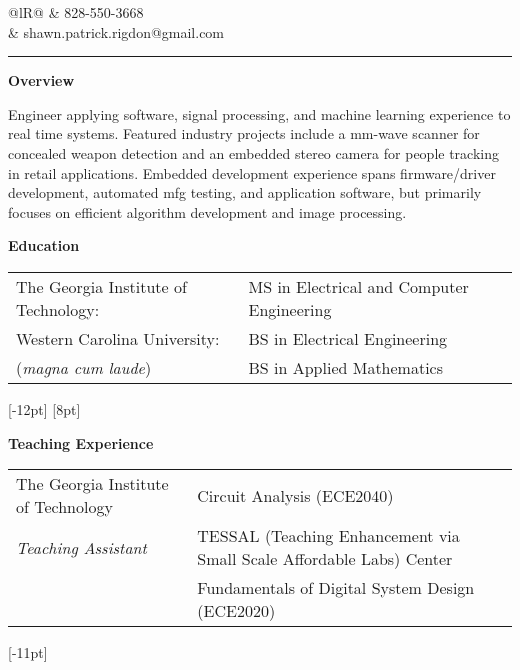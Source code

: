 \documentclass[10pt,letterpaper]{article}
\begin{document}
\pagestyle{empty}


\noindent
\begin{tabularx}{\linewidth}{@{}lR@{}}
 & \footnotesize{828-550-3668} \\[-4pt]
& \footnotesize{shawn.patrick.rigdon@gmail.com} \\[-4pt]
\end{tabularx}

\smallskip
\noindent\rule[\baselineskip]{\linewidth}{1.5pt}


\medskip
\noindent\textbf{\large{Overview}}

\medskip
\noindent\footnotesize{Engineer applying software, signal processing, and machine learning experience
to real time systems.  Featured industry projects include a mm-wave scanner for concealed weapon
detection and an embedded stereo camera for people tracking in retail applications.  Embedded development
experience spans firmware/driver development, automated mfg testing, and application software, but primarily
focuses on efficient algorithm development and image processing.}

\bigskip
\noindent\textbf{\large{Education}}

\medskip\noindent
\begin{tabular}{@{}ll@{}}
\footnotesize{The Georgia Institute of Technology:} & \footnotesize{MS in Electrical and Computer Engineering}\\[5pt]
\footnotesize{Western Carolina University:} & \footnotesize{BS in Electrical Engineering}\\
\footnotesize{(\textit{magna cum laude})} & \footnotesize{BS in Applied Mathematics}\\
\end{tabular}
[-12pt]
[8pt]

\bigskip
\noindent\textbf{\large{Teaching Experience}}

\medskip\noindent
\begin{tabular}{@{}ll@{}}
\footnotesize{The Georgia Institute of Technology} & \footnotesize{Circuit Analysis (ECE2040)}\\
\footnotesize{\textit{Teaching Assistant}} & \footnotesize{TESSAL (Teaching Enhancement via Small Scale Affordable Labs) Center}\\
& \footnotesize{Fundamentals of Digital System Design
(ECE2020)}\\
\end{tabular}
[-11pt]
\end{document}
